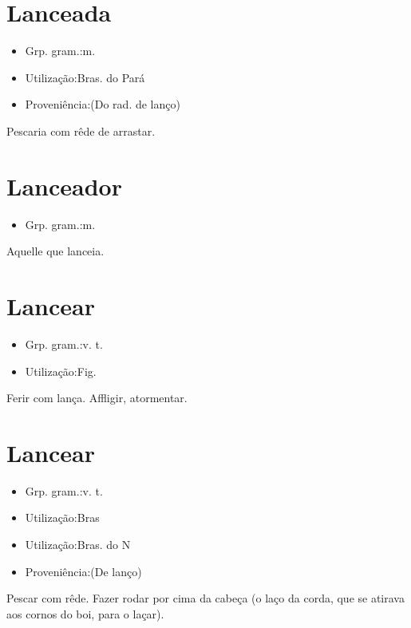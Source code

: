 \section{Lanceada}
\begin{itemize}
\item {Grp. gram.:m.}
\end{itemize}
\begin{itemize}
\item {Utilização:Bras. do Pará}
\end{itemize}
\begin{itemize}
\item {Proveniência:(Do rad. de \textunderscore lanço\textunderscore )}
\end{itemize}
Pescaria com rêde de arrastar.
\section{Lanceador}
\begin{itemize}
\item {Grp. gram.:m.}
\end{itemize}
Aquelle que lanceia.
\section{Lancear}
\begin{itemize}
\item {Grp. gram.:v. t.}
\end{itemize}
\begin{itemize}
\item {Utilização:Fig.}
\end{itemize}
Ferir com lança.
Affligir, atormentar.
\section{Lancear}
\begin{itemize}
\item {Grp. gram.:v. t.}
\end{itemize}
\begin{itemize}
\item {Utilização:Bras}
\end{itemize}
\begin{itemize}
\item {Utilização:Bras. do N}
\end{itemize}
\begin{itemize}
\item {Proveniência:(De \textunderscore lanço\textunderscore )}
\end{itemize}
Pescar com rêde.
Fazer rodar por cima da cabeça (o laço da corda, que se atirava aos cornos do boi, para o laçar).
